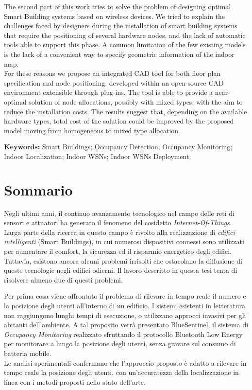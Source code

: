 The second part of this work tries to solve the problem of designing optimal Smart Building systems based on wireless devices. We tried to explain the challenges faced by designers during the installation of smart building systems that require the positioning of several hardware nodes, and the lack of automatic tools able to support this phase. A common limitation of the few existing models is the lack of a convenient way to specify geometric information of the indoor map.\\
For these reasons we propose an integrated CAD tool for both floor plan specification and node positioning, developed within an \mbox{open-source} CAD environment extensible through plug-ins. The tool is able to provide a near-optimal solution of node allocations, possibly with mixed types, with the aim to reduce the installation costs. The results suggest that, depending on the available hardware types, total cost of the solution could be improved by the proposed model moving from homogeneous to mixed type allocation.

\medskip
%
\noindent \textbf{Keywords:} 
Smart Buildings; Occupancy Detection; Occupancy Monitoring; Indoor Localization; Indoor WSNs; Indoor WSNs Deployment;
%
\clearpage
%
%
%
%
\chapter*{Sommario}
%
Negli ultimi anni, il continuo avanzamento tecnologico nel campo delle reti di sensori e attuatori ha generato il fenomeno del cosidetto \emph{Internet-Of-Things}. Larga parte della ricerca in questo campo è rivolto alla realizzazione di \emph{edifici intelligenti} (Smart Buildings), in cui numerosi dispositivi connessi sono utilizzati per aumentare il comfort, la sicurezza ed il risparmio energetico degli edifici. Tuttavia, esistono ancora alcuni problemi irrisolti che ostacolano la diffusione di queste tecnologie negli edifici odierni. Il lavoro descritto in questa tesi tenta di risolvere almeno due di questi problemi.

Per prima cosa viene affrontato il problema di rilevare in tempo reale il numero e la posizione degli utenti all'interno di un edificio. I sistemi esistenti in letteratura non raggiungono lunghi tempi di esecuzione, o utilizzano approcci invasivi per gli abitanti dell'ambiente.
A tal proposito verrà presentato BlueSentinel, il sistema di \emph{Occupancy Monitoring} realizzato sfruttando il protocollo Bluetooth Low Energy per monitorare a lungo la posizione degli utenti, senza gravare sul consumo di batteria mobile.\\
Le analisi sperimentali confermano che l'approccio proposto è adatto a rilevare in tempo reale la posizione degli utenti, con un'accuratezza della localizzazione in linea con i metodi proposti nello stato dell'arte.

